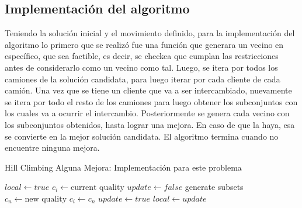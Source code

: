 \documentclass{article}
\begin{document}
\subsection{Implementación del algoritmo}
Teniendo la solución inicial y el movimiento definido, para la implementación del algoritmo lo primero que se realizó fue una función que generara un vecino en específico, que sea factible, es decir, se checkea que cumplan las restricciones antes de considerarlo como un vecino como tal. Luego, se itera por todos los camiones de la solución candidata, para luego iterar por cada cliente de cada camión. Una vez que se tiene un cliente que va a ser intercambiado, nuevamente se itera por todo el resto de los camiones para luego obtener los subconjuntos con los cuales va a ocurrir el intercambio. Posteriormente se genera cada vecino con los subconjuntos obtenidos, hasta lograr una mejora. En caso de que la haya, esa se convierte en la mejor solución candidata. El algoritmo termina cuando no encuentre ninguna mejora. 

\begin{algorithm}[H]
    \caption{Hill Climbing Alguna Mejora: Implementación para este problema}\label{alg:cap1}
    \begin{algorithmic}
        \State $local \gets true$
            \State $c_i \gets \text{current quality}$
            \State $update \gets false$
                        \State generate subsets
                            \State $c_n \gets \text{new quality}$
                                \State $c_i \gets c_n$
                                \State $update \gets true$
                            \EndIf
                        \EndIf
                    \EndFor
                \EndFor
            \EndFor
            \State $local \gets update$
        \EndWhile
    \end{algorithmic}
\end{algorithm}

\newpage
\end{document}
